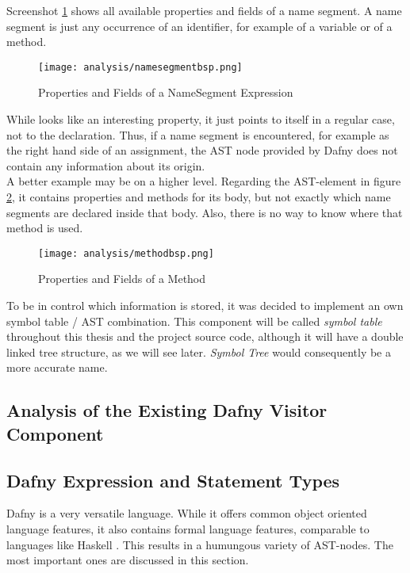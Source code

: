 Screenshot \ref{fig:namesegment} shows all available properties and fields of a name segment.
A name segment is just any occurrence of an identifier, for example of a variable or of a method.
\begin{figure}[H]
    \centering
    \texttt{[image: analysis/namesegmentbsp.png]}
    \caption{Properties and Fields of a NameSegment Expression}
    \label{fig:namesegment}
\end{figure}
While  looks like an interesting property, it just points to itself in a regular case, not to the declaration.
Thus, if a name segment is encountered, for example as the right hand side of an assignment, the AST node provided by Dafny does not contain any information about its origin.\\

A better example may be on a higher level.
Regarding the AST-element  in figure \ref{fig:method},
it contains properties and methods for its body, but not exactly which name segments are declared inside that body.
Also, there is no way to know where that method is used.

\begin{figure}[H]
    \centering
    \texttt{[image: analysis/methodbsp.png]}
    \caption{Properties and Fields of a Method}
    \label{fig:method}
\end{figure}

To be in control which information is stored, it was decided to implement an own symbol table / AST combination.
This component will be called \textit{symbol table} throughout this thesis and the project source code, although it will have a double linked tree structure, as we will see later.
\textit{Symbol Tree} would consequently be a more accurate name.



\subsection{Analysis of the Existing Dafny Visitor Component}


\subsection{Dafny Expression and Statement Types}
\label{section:analysis_dafnyASTStuff}
Dafny is a very versatile language.
While it offers common object oriented language features, it also contains formal language features, comparable to languages like Haskell \cite{haskell}.
This results in a humungous variety of AST-nodes.
The most important ones are discussed in this section.\\

